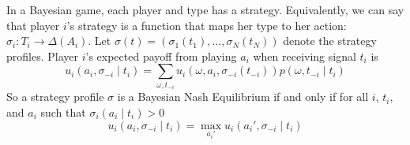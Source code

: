 \documentclass[10pt]{article}
\begin{document}
\begin{definition}
	In a Bayesian game, each player and type has a strategy. Equivalently, we can say that player $i$'s strategy is a function that maps her type to her action: $\sigma_i: T_i \to \Delta(A_i)$. Let $\sigma(t) = (\sigma_1(t_1),\dots,\sigma_N(t_N))$ denote the strategy profiles. Player $i$'s expected payoff from playing $a_i$ when receiving signal $t_i$ is \[u_i(a_i,\sigma_{-i}\mid t_i) = \sum_{\omega,t_{-i}} u_i(\omega,a_i,\sigma_{-i}(t_{-i}))p(\omega,t_{-i}\mid t_i)\]So a strategy profile $\sigma$ is a Bayesian Nash Equilibrium if and only if for all $i$, $t_i$, and $a_i$ such that $\sigma_i(a_i \mid t_i)> 0$\[u_i(a_i,\sigma_{-i}\mid t_i) = \max_{a_i'}u_i(a_i',\sigma_{-i}\mid t_i)\]
\end{definition}
\end{document}
